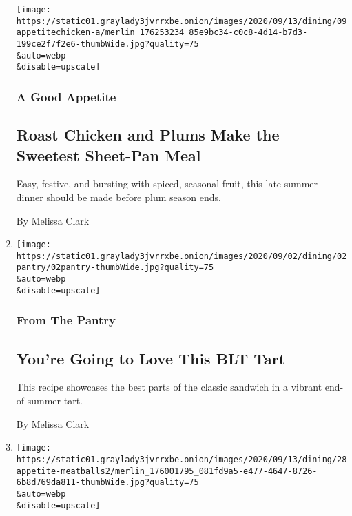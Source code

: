 \begin{enumerate}
  \texttt{[image: https://static01.graylady3jvrrxbe.onion/images/2020/09/13/dining/09appetitechicken-a/merlin\_176253234\_85e9bc34-c0c8-4d14-b7d3-199ce2f7f2e6-thumbWide.jpg?quality=75\\\&auto=webp\\\&disable=upscale]}

  \hypertarget{a-good-appetite-1}{%
  \subsubsection{A Good Appetite}\label{a-good-appetite-1}}

  \hypertarget{roast-chicken-and-plums-make-the-sweetest-sheet-pan-meal}{%
  \subsection{Roast Chicken and Plums Make the Sweetest Sheet-Pan
  Meal}\label{roast-chicken-and-plums-make-the-sweetest-sheet-pan-meal}}

  Easy, festive, and bursting with spiced, seasonal fruit, this late
  summer dinner should be made before plum season ends.

  By Melissa Clark
\item
  \href{/2020/09/02/dining/blt-tart-recipe.html}{}

  \texttt{[image: https://static01.graylady3jvrrxbe.onion/images/2020/09/02/dining/02pantry/02pantry-thumbWide.jpg?quality=75\\\&auto=webp\\\&disable=upscale]}

  \hypertarget{from-the-pantry-1}{%
  \subsubsection{From The Pantry}\label{from-the-pantry-1}}

  \hypertarget{youre-going-to-love-this-blt-tart}{%
  \subsection{You're Going to Love This BLT
  Tart}\label{youre-going-to-love-this-blt-tart}}

  This recipe showcases the best parts of the classic sandwich in a
  vibrant end-of-summer tart.

  By Melissa Clark
\item
  \href{/2020/08/28/dining/peach-meatball-recipe.html}{}

  \texttt{[image: https://static01.graylady3jvrrxbe.onion/images/2020/09/13/dining/28appetite-meatballs2/merlin\_176001795\_081fd9a5-e477-4647-8726-6b8d769da811-thumbWide.jpg?quality=75\\\&auto=webp\\\&disable=upscale]}


\end{enumerate}

